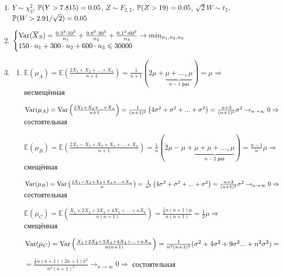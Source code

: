 \documentclass[12pt, a4paper]{article}\usepackage[]{graphicx}\usepackage[]{color}
\begin{document}
\begin{enumerate}
							\item $Y \sim \chi^2_3$, $\P(Y>7.815)=0.05$, $Z \sim F_{2,2}$, $\P(Z>19)=0.05$, $\sqrt{2}W \sim t_{2}$, $\P(W > 2.91/\sqrt{2})=0.05$

							\item
							$
							\begin{cases}
							\Var(\overline{X}_S) = \frac{0.3^2\cdot 10^2}{n_1} + \frac{0.6^2 \cdot 30^2}{n_2} + \frac{0.1^2 \cdot 60^2}{n_3} \to min_{n_1, n_2, n_3} \\
							150\cdot n_1 + 300 \cdot n_2 + 600 \cdot n_3 \leq 30000
							\end{cases}
							$

							\item
							\begin{enumerate}
								\item $\mathbb{E}(\mu_A) = \mathbb{E}\left(\frac{2X_1 + X_2 + ... + X_n}{n+1}\right) = \frac{1}{n+1} \left(2\mu + \underbrace{\mu + ... _+ \mu}_{n-1 \text{ раз}}\right) = \mu \Rightarrow$  несмещённая

								$\Var(\mu_A) = \Var\left(\frac{2X_1 + X_2 + ... + X_n}{n+1}\right) = \frac{1}{(n+1)^2}\left(4\sigma^2 + \sigma^2 + ... + \sigma^2\right) = \frac{n+3}{(n+1)^2} \sigma^2 \to_{n \to \infty} 0 \Rightarrow$ состоятельная

								$\mathbb{E}(\mu_B) = \mathbb{E}\left(\frac{2X_1 - X_2 + X_3 + X_4 + ... + X_n}{n+1}\right) = \frac{1}{n} \left(2\mu - \mu + \underbrace{\mu + \mu + ... _+ \mu}_{n-2 \text{ раз}}\right) = \frac{n-1}{n}\mu \Rightarrow$ смещённая

								$\Var(\mu_B) = \Var\left(\frac{2X_1 - X_2 + X_3 + X_4 + ... + X_n}{n}\right) = \frac{1}{n^2}\left(4\sigma^2 + \sigma^2 + ... + \sigma^2\right) = \frac{n+3}{(n+1)^2} \sigma^2 \to_{n \to \infty} 0 \Rightarrow$ состоятельная

								$\mathbb{E}(\mu_C) = \mathbb{E}\left(\frac{X_1 + 2X_2 + 3X_3 + 4X_4 + ... +n X_n}{n(n+1)}\right) = \frac{\frac{1}{2} n(n+1)\mu}{n(n+1)} = \frac{1}{2} \mu \Rightarrow $ смещённая

								$\Var(\mu_C) = \Var\left(\frac{X_1 + 2X_2 + 3X_3 + 4X_4 + ... + nX_n}{n(n+1)}\right) = \frac{1}{n^2(n+1)^2}(\sigma^2 + 4\sigma^2 + 9\sigma^2 ... + n^2\sigma^2) = $

								$=  \frac{\frac{1}{6}n(n+1)(2n+1)\sigma^2}{n^2(n+1)^2}   \to_{n \to \infty} 0 \Rightarrow$ состоятельная

							\end{enumerate}
						\end{enumerate}
\end{document}

